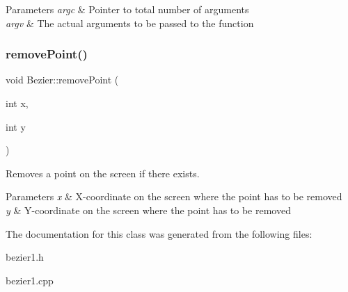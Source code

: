 \begin{DoxyParams}{Parameters}
{\em argc} & Pointer to total number of arguments \\
\hline
{\em argv} & The actual arguments to be passed to the function \\
\hline
\end{DoxyParams}
\mbox{\label{class_bezier_a75b6151225690003365386cb63c42704}} 
\subsubsection{\texorpdfstring{remove\+Point()}{removePoint()}}
{\footnotesize\ttfamily void Bezier\+::remove\+Point (\begin{DoxyParamCaption}\item[{int}]{x,  }\item[{int}]{y }\end{DoxyParamCaption})}



Removes a point on the screen if there exists. 


\begin{DoxyParams}{Parameters}
{\em x} & X-\/coordinate on the screen where the point has to be removed \\
\hline
{\em y} & Y-\/coordinate on the screen where the point has to be removed \\
\hline
\end{DoxyParams}


The documentation for this class was generated from the following files\+:\begin{DoxyCompactItemize}
\item 
bezier1.\+h\item 
bezier1.\+cpp\end{DoxyCompactItemize}
